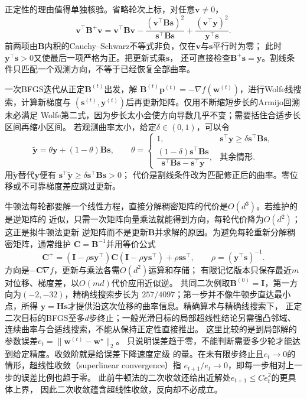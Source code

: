 正定性的理由值得单独核验。省略轮次上标，对任意$\bm v\neq0$，
\[
 \bm v^\top\bm B^+\bm v
 =\bm v^\top\bm B\bm v
 -\frac{(\bm v^\top\bm B\bm s)^2}{\bm s^\top\bm B\bm s}
 +\frac{(\bm v^\top\bm y)^2}{\bm y^\top\bm s}.
\]
前两项由$\bm B$内积的Cauchy--Schwarz不等式非负，仅在$\bm v$与$\bm s$平行时为零；
此时$\bm y^\top\bm s>0$又使最后一项严格为正。把更新式乘$\bm s$，
还可直接检查$\bm B^+\bm s=\bm y$。割线条件只匹配一个观测方向，不等于已经恢复全部曲率。

一次BFGS迭代从正定$\bm B^{(t)}$出发，解
$\bm B^{(t)}\bm p^{(t)}=-\nabla f(\bm w^{(t)})$，进行Wolfe线搜索，计算新梯度与
$(\bm s^{(t)},\bm y^{(t)})$后再更新矩阵。仅用不断缩短步长的Armijo回溯未必满足
Wolfe第二式，因为步长太小会使方向导数几乎不变；需要括住合适步长区间再缩小区间。
若观测曲率太小，给定$\delta\in(0,1)$，可以令
\[
 \widetilde{\bm y}=\theta\bm y+(1-\theta)\bm B\bm s,\qquad
 \theta=
 \begin{cases}
 1,&\bm s^\top\bm y\geq\delta\bm s^\top\bm B\bm s,\\
 \dfrac{(1-\delta)\bm s^\top\bm B\bm s}
 {\bm s^\top\bm B\bm s-\bm s^\top\bm y},&\text{其余情形}.
 \end{cases}
\]
用$\widetilde{\bm y}$替代$\bm y$便有
$\bm s^\top\widetilde{\bm y}\geq\delta\bm s^\top\bm B\bm s>0$；
代价是割线条件改为匹配修正后的曲率。零位移或不可靠梯度差应跳过更新。

牛顿法每轮都要解一个线性方程，直接分解稠密矩阵的代价是$O(d^3)$。若维护的是逆矩阵的
近似，只需一次矩阵向量乘法就能得到方向，每轮代价降为$O(d^2)$；这正是拟牛顿法更新
逆矩阵而不是更新$\bm B$并求解的原因。为避免每轮重新分解稠密矩阵，通常维护
$\bm C=\bm B^{-1}$并用等价公式
\[
 \bm C^+=(\bm I-\rho\bm s\bm y^\top)\bm C
          (\bm I-\rho\bm y\bm s^\top)+\rho\bm s\bm s^\top,
 \qquad \rho=(\bm y^\top\bm s)^{-1}.
\]
方向是$-\bm C\nabla f$，更新与乘法各需$O(d^2)$运算和存储；
有限记忆版本只保存最近$m$对位移、梯度差，以$O(md)$代价应用近似逆。
共同二次例取$\bm B^{(0)}=\bm I$，第一方向为$(-2,-32)$，精确线搜索步长为
$257/4097$；第一步并不像牛顿步直达最小点，所得
$\bm y=\bm H\bm s$才提供沿这次位移的曲率信息。精确算术与精确线搜索下，
正定二次目标的BFGS至多$d$步终止；一般光滑目标的局部超线性结论另需强凸邻域、
连续曲率与合适线搜索，不能从保持正定性直接推出。
这里比较的是到局部解的参数误差$e_t=\|\bm w^{(t)}-\bm w^\star\|_2$。
只说明误差趋于零，不能判断需要多少轮才能达到给定精度。收敛阶就是给误差下降速度定级
的量。在未有限步终止且$e_t\to0$的情形，超线性收敛（superlinear convergence）指
$e_{t+1}/e_t\to0$，即每一步相对上一步的误差比例也趋于零。
此前牛顿法的二次收敛还给出近解处$e_{t+1}\leq Ce_t^2$的更具体上界，
因此二次收敛蕴含超线性收敛，反向却不必成立。

